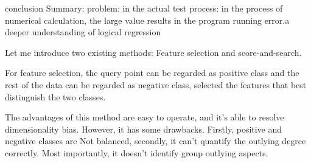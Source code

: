 \documentclass[
 size=14pt,
 paper=smartboard,  %
 mode=present, 		%
 display=slides, 	%
 style=tuliplab,  	%
 pauseslide,
 fleqn,leqno]{powerdot}
\begin{document}
\begin{slide}{conclusion}
  Summary: problem: in the actual test process: in the process of numerical calculation, the large value results in the program running error.a deeper understanding of logical regression

  
  
  
  \begin{note}
  Let me introduce two existing methods:
  Feature selection and score-and-search.
  
  For feature selection,
  the query point can be regarded as positive class and
  the rest of the data can be regarded as negative class,
  selected the features that best distinguish the two classes.
  
  The advantages of this method are easy to operate,
  and it's able to resolve dimensionality bias.
  However, it has some drawbacks.
  Firstly,
  positive and negative classes are Not balanced,
  secondly,
  it can't quantify the outlying degree correctly.
  Most importantly,
  it doesn't identify group outlying aspects.
  \end{note}
  
  \end{slide}
\end{document}
